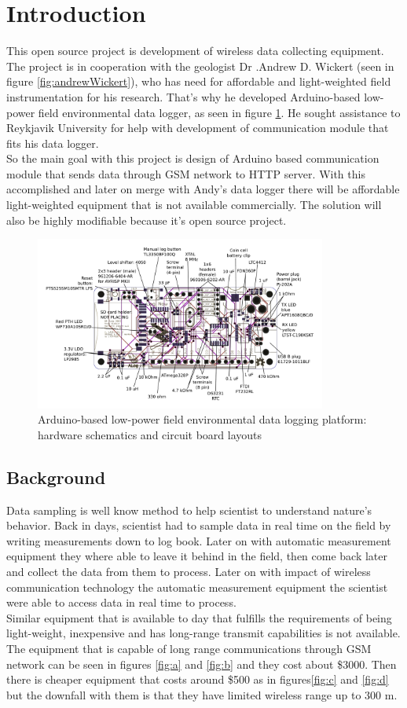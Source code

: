 \section{Introduction}
This open source project is development of wireless data collecting equipment. The project is in cooperation with the geologist Dr .Andrew D. Wickert (seen in figure \ref{fig:andrewWickert}), who has need for affordable and light-weighted field instrumentation for his research. That's why he developed Arduino-based low-power field environmental data logger, as seen in figure \ref{fig:BottleLog}. He sought assistance to Reykjavik University for help with development of communication module that fits his data logger.\\
So the main goal with this project is design of Arduino based communication module that sends data through GSM network to HTTP server. With this accomplished and later on merge with Andy's data logger there will be affordable light-weighted equipment that is not available commercially. The solution will also be highly modifiable because it's open source project.

\begin{figure}
\centering
\includegraphics[height=5.7cm]{graphics/ALog_drawing.PDF}
\caption{Arduino-based low-power field environmental data logging platform: hardware schematics and circuit board layouts\label{fig:BottleLog}\cite{ALog-BottleLogger}}
\end{figure}

\subsection{Background}
Data sampling is well know method to help scientist to understand nature's behavior. Back in days, scientist had to sample data in real time on the field by writing measurements down to log book. Later on with automatic measurement equipment they where able to leave it behind in the field, then come back later and collect the data from them to process. Later on with impact of wireless communication technology the automatic measurement equipment the scientist were able to access data in real time to process.\\
Similar equipment that is available to day that fulfills the requirements of being light-weight, inexpensive and has long-range transmit capabilities is not available. The equipment that is capable of long range communications through GSM network can be seen in figures \ref{fig:a} and \ref{fig:b} and they cost about \$3000. Then there is cheaper equipment that costs around \$500 as in figures\ref{fig:c} and  \ref{fig:d} but the downfall with them is that they have limited wireless range up to 300 m.

